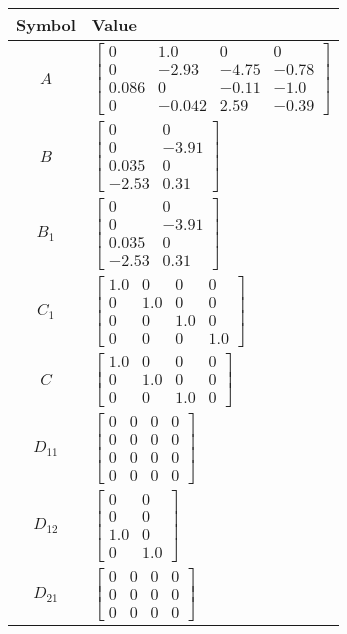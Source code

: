 \begin{tabular}{cl}
\hline
  Symbol  & Value                                                                                                                                    \\
\hline
   $A$    & $\left[\begin{matrix}0 & 1.0 & 0 & 0\\0 & -2.93 & -4.75 & -0.78\\0.086 & 0 & -0.11 & -1.0\\0 & -0.042 & 2.59 & -0.39\end{matrix}\right]$ \\
   $B$    & $\left[\begin{matrix}0 & 0\\0 & -3.91\\0.035 & 0\\-2.53 & 0.31\end{matrix}\right]$                                                       \\
 $B_{1}$  & $\left[\begin{matrix}0 & 0\\0 & -3.91\\0.035 & 0\\-2.53 & 0.31\end{matrix}\right]$                                                       \\
 $C_{1}$  & $\left[\begin{matrix}1.0 & 0 & 0 & 0\\0 & 1.0 & 0 & 0\\0 & 0 & 1.0 & 0\\0 & 0 & 0 & 1.0\end{matrix}\right]$                              \\
   $C$    & $\left[\begin{matrix}1.0 & 0 & 0 & 0\\0 & 1.0 & 0 & 0\\0 & 0 & 1.0 & 0\end{matrix}\right]$                                               \\
 $D_{11}$ & $\left[\begin{matrix}0 & 0 & 0 & 0\\0 & 0 & 0 & 0\\0 & 0 & 0 & 0\\0 & 0 & 0 & 0\end{matrix}\right]$                                      \\
 $D_{12}$ & $\left[\begin{matrix}0 & 0\\0 & 0\\1.0 & 0\\0 & 1.0\end{matrix}\right]$                                                                  \\
 $D_{21}$ & $\left[\begin{matrix}0 & 0 & 0 & 0\\0 & 0 & 0 & 0\\0 & 0 & 0 & 0\end{matrix}\right]$                                                     \\
\hline
\end{tabular}